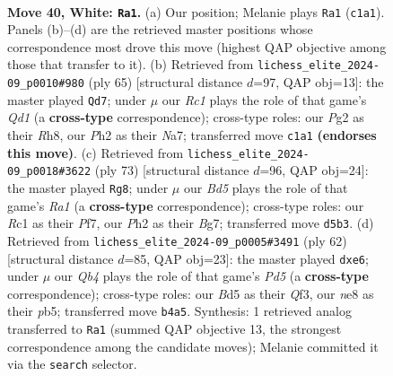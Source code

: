 \documentclass[11pt]{article}
\begin{document}
\clearpage

\begin{figure}[p]\centering
\begin{subfigure}{0.46\textwidth}\centering
\resizebox{\linewidth}{!}{%
\newchessgame
\chessboard[
  setfen={4n3/3b2k1/p6r/n2BPpqp/PQ1P2p1/N7/5PPP/2R1K1N1 w - - 2 40},
  showmover=false,
  pgfstyle=straightmove, color=movearrow, markmove={c1-a1}
]}
\caption{}
\end{subfigure}\hfill
\begin{subfigure}{0.46\textwidth}\centering
\resizebox{\linewidth}{!}{%
\newchessgame
\chessboard[
  setfen={3q1k1r/np3p2/7p/pP1pP3/P2P1bP1/3Q1N2/2R2PP1/6K1 b - - 1 33},
  showmover=false,
  pgfstyle=straightmove, color=movearrow, markmove={d8-d7}
]}
\caption{}
\end{subfigure}
\\[4pt]
\begin{subfigure}{0.46\textwidth}\centering
\resizebox{\linewidth}{!}{%
\newchessgame
\chessboard[
  setfen={r7/3q1pbk/p1Np4/Pp1P4/2p2BnP/8/1PPQR3/6K1 b - - 3 37},
  showmover=false,
  pgfstyle=straightmove, color=movearrow, markmove={a8-g8}
]}
\caption{}
\end{subfigure}\hfill
\begin{subfigure}{0.46\textwidth}\centering
\resizebox{\linewidth}{!}{%
\newchessgame
\chessboard[
  setfen={r3q1kb/1p5p/3pn1pB/PppP4/6P1/2P2Q1P/1P6/5RK1 w - - 0 32},
  showmover=false,
  pgfstyle=straightmove, color=movearrow, markmove={d5-e6}
]}
\caption{}
\end{subfigure}
\caption{\textbf{Move 40, White: \texttt{Ra1}.} (a) Our position; Melanie plays \texttt{Ra1} (\texttt{c1a1}). Panels (b)--(d) are the retrieved master positions whose correspondence most drove this move (highest QAP objective among those that transfer to it). (b) Retrieved from \texttt{lichess\_elite\_2024-09\_p0010\#980} (ply 65) [structural distance $d$=97, QAP obj=13]: the master played \texttt{Qd7}; under $\mu$ our \emph{Rc1} plays the role of that game's \emph{Qd1} (a \textbf{cross-type} correspondence); cross-type roles: our \emph{P}g2 as their \emph{R}h8, our \emph{P}h2 as their \emph{N}a7; transferred move \texttt{c1a1} \textbf{(endorses this move)}. (c) Retrieved from \texttt{lichess\_elite\_2024-09\_p0018\#3622} (ply 73) [structural distance $d$=96, QAP obj=24]: the master played \texttt{Rg8}; under $\mu$ our \emph{Bd5} plays the role of that game's \emph{Ra1} (a \textbf{cross-type} correspondence); cross-type roles: our \emph{R}c1 as their \emph{P}f7, our \emph{P}h2 as their \emph{B}g7; transferred move \texttt{d5b3}. (d) Retrieved from \texttt{lichess\_elite\_2024-09\_p0005\#3491} (ply 62) [structural distance $d$=85, QAP obj=23]: the master played \texttt{dxe6}; under $\mu$ our \emph{Qb4} plays the role of that game's \emph{Pd5} (a \textbf{cross-type} correspondence); cross-type roles: our \emph{B}d5 as their \emph{Q}f3, our \emph{n}e8 as their \emph{p}b5; transferred move \texttt{b4a5}. Synthesis: 1 retrieved analog transferred to \texttt{Ra1} (summed QAP objective 13, the strongest correspondence among the candidate moves); Melanie committed it via the \texttt{search} selector.}
\label{fig:thought-m78}
\end{figure}
\end{document}
